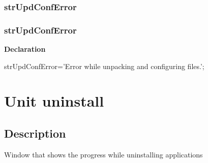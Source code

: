 \documentclass{report}
\newif\ifpdf
\begin{document}
\subsection*{\large{\textbf{strUpdConfError}}\normalsize\hspace{1ex}\hrulefill}
\else
\subsection*{strUpdConfError}
\fi
\label{trstrings-strUpdConfError}
\begin{list}{}{
\setlength{\itemindent}{0cm}
\setlength{\listparindent}{0cm}
\setlength{\leftmargin}{\evensidemargin}
\addtolength{\leftmargin}{\tmplength}
\settowidth{\labelsep}{X}
\addtolength{\leftmargin}{\labelsep}
\setlength{\labelwidth}{\tmplength}
}
\item[\textbf{Declaration}\hfill]
\ifpdf
\begin{flushleft}
\fi
\begin{ttfamily}
strUpdConfError='Error while unpacking and configuring files.';\end{ttfamily}

\ifpdf
\end{flushleft}
\fi

\end{list}
\chapter{Unit uninstall}
\label{uninstall}
\section{Description}
Window that shows the progress while uninstalling applications
\end{document}
